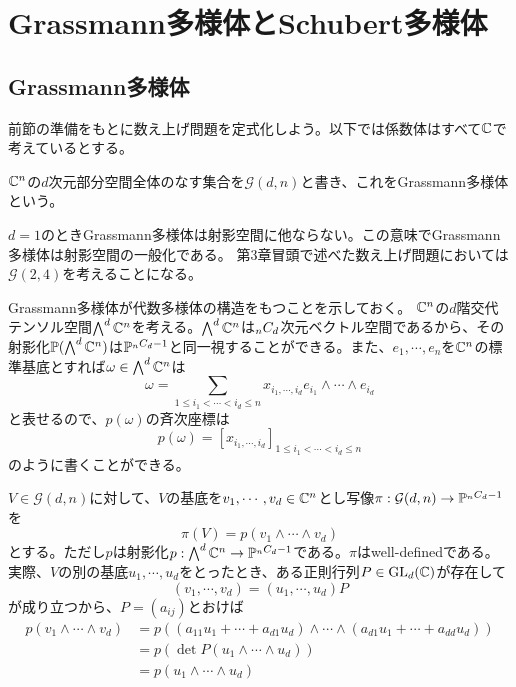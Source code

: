 \documentclass{ltjsreport}
\begin{document}
\section{Grassmann多様体とSchubert多様体}
\subsection{Grassmann多様体}

前節の準備をもとに数え上げ問題を定式化しよう。以下では係数体はすべて$\mathbb{C}$で考えているとする。

\begin{defin}
  $\mathbb{C}^{n}$の$d$次元部分空間全体のなす集合を$\mathcal{G}(d,n)$と書き、これをGrassmann多様体という。
\end{defin}

$d=1$のときGrassmann多様体は射影空間に他ならない。この意味でGrassmann多様体は射影空間の一般化である。
第3章冒頭で述べた数え上げ問題においては$\mathcal{G}(2,4)$を考えることになる。

Grassmann多様体が代数多様体の構造をもつことを示しておく。
$\mathbb{C}^n$の$d$階交代テンソル空間$\bigwedge^d\mathbb{C}^n$を考える。$\bigwedge^d\mathbb{C}^n$は$_{n}C_{d}$次元ベクトル空間であるから、その射影化$\mathbb{P}(\bigwedge^d\mathbb{C}^n)$は$\mathbb{P}^{_{n}C_{d}-1}$と同一視することができる。また、$e_1,\cdots,e_n$を$\mathbb{C}^n$の標準基底とすれば$\omega\in\bigwedge^d\mathbb{C}^n$は
\[
\omega=\sum_{1\leq i_1<\cdots <i_d\leq n}x_{i_1,\cdots, i_d}e_{i_1}\wedge\cdots\wedge e_{i_d}  
\]
と表せるので、$p(\omega)$の斉次座標は
\[
p(\omega)=[x_{i_1,\cdots,i_d}]_{1\leq i_1<\cdots<i_d\leq n}  
\]
のように書くことができる。





$V\in\mathcal{G}(d,n)$に対して、$V$の基底を$v_1,\cdots,v_d\in\mathbb{C}^n$とし写像$\pi:\mathcal{G}(d,n)\rightarrow \mathbb{P}^{_{n}C_{d}-1}$を
\[
\pi(V)=p(v_1\wedge\cdots\wedge v_d)  
\]
とする。ただし$p$は射影化$p:\bigwedge^d\mathbb{C}^n\rightarrow \mathbb{P}^{_{n}C_{d}-1}$である。$\pi$はwell-definedである。実際、$V$の別の基底$u_1,\cdots,u_d$をとったとき、ある正則行列$P\in\text{GL}_d(\mathbb{C})$が存在して
\[
(v_1,\cdots,v_d)=(u_1,\cdots,u_d)P  
\]
が成り立つから、$P=(a_{ij})$とおけば
\begin{align*}
  p(v_1\wedge\cdots\wedge v_d)
  &=p\left(
    (a_{11}u_1+\cdots+a_{d1}u_d)\wedge\cdots\wedge
    (a_{d1}u_1+\cdots+a_{dd}u_d)
  \right)\\
  &=p(\det P(u_1\wedge\cdots\wedge u_d))\\
  &=p(u_1\wedge\cdots\wedge u_d)
\end{align*}
\end{document}
